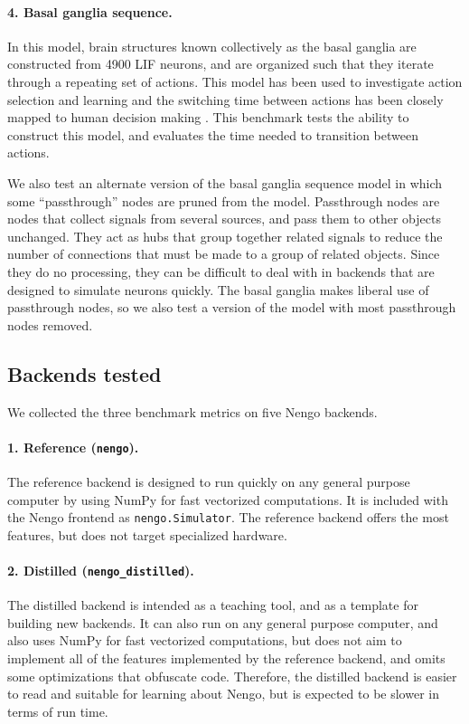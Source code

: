 \documentclass{frontiersSCNS}
\begin{document}
\paragraph{4. Basal ganglia sequence.}
In this model, brain structures
known collectively as the basal ganglia
are constructed from 4900 LIF neurons,
and are organized such that they iterate
through a repeating set of actions.
This model has been used to investigate
action selection and learning \citep{stewart2012a}
and the switching time between actions
has been closely mapped to human decision making
\citep{stewart2010}.
This benchmark tests the ability
to construct this model,
and evaluates the time needed
to transition between actions.

We also test an alternate version
of the basal ganglia sequence model
in which some ``passthrough'' nodes
are pruned from the model.
Passthrough nodes are nodes
that collect signals from several sources,
and pass them to other objects unchanged.
They act as hubs
that group together related signals
to reduce the number of connections
that must be made to
a group of related objects.
Since they do no processing,
they can be difficult to deal with
in backends that are designed to
simulate neurons quickly.
The basal ganglia makes liberal use
of passthrough nodes,
so we also test a version of the model
with most passthrough nodes removed.

\subsection{Backends tested}

We collected the three benchmark metrics
on five Nengo backends.

\paragraph{1. Reference (\texttt{nengo}).}
The reference backend is designed to run quickly
on any general purpose computer
by using NumPy \citep{vanderwalt2011}
for fast vectorized computations.
It is included with the Nengo frontend
as \texttt{nengo.Simulator}.
The reference backend offers
the most features, but does not target
specialized hardware.

\paragraph{2. Distilled (\texttt{nengo\_distilled}).}
The distilled backend is intended as a teaching tool,
and as a template for building new backends.
It can also run on any general purpose computer,
and also uses NumPy for fast vectorized computations,
but does not aim to implement all of the features
implemented by the reference backend,
and omits some optimizations that obfuscate code.
Therefore, the distilled backend is easier to read
and suitable for learning about Nengo,
but is expected to be slower in terms of run time.
\end{document}
